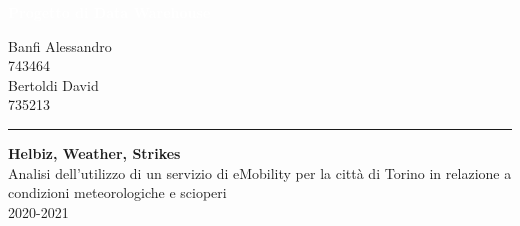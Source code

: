 \documentclass[12pt, a4paper, oneside]{report}
\author{%
    Banfi Alessandro \\
    743464 \\
    -\\
    Bertoldi David \\
    735213 \\
    -\\
    }
\begin{document}
\begin{titlepage}
\BgThispage
{}
\vspace*{0.4\textheight}
\noindent
\textcolor{white}{\Huge\textbf{\textsf{Progetto di Data Warehouse}}}
\vspace*{2cm}\par
\noindent
\begin{minipage}{0.35\linewidth}
    \begin{flushright}
        {%
    Banfi Alessandro \\
    743464 \\[2\baselineskip]
    
    Bertoldi David \\
    735213 
    
    }
    \end{flushright}
\end{minipage} \hspace{35pt}
%
\begin{minipage}{0.02\linewidth}
    \rule{1pt}{175pt}
\end{minipage} \hspace{10pt}
%
\begin{minipage}{0.63\linewidth}
\vspace{5pt}
    {\Huge\textbf{Helbiz, Weather, Strikes\\[10pt]}}
   	Analisi dell'utilizzo di un servizio di eMobility per la città di Torino
	in relazione a condizioni meteorologiche e scioperi
    \\ 2020-2021
\end{minipage}
\end{titlepage}
\restoregeometry


\newpage\tableofcontents\newpage








\end{document}
